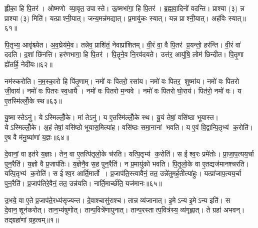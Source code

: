 ह्लीका॒ हि पि॒तर॑।
ओष्मणो व्या॒वृत॒ उपास्ते।
ऊ॒ष्मभा॑गा॒ हि पि॒तर॑।
ब्र॒ह्म॒वा॒दिनो॑ वदन्ति।
प्राश्या (३) न्न प्राश्या (३) मिति॑।
यत्प्राश्नी॒यात्।
जन्य॒मन्न॑मद्यात्।
प्र॒मायु॑कः स्यात्।
यन्न प्राश्नी॒यात्।
अह॑विः स्यात्॥६१॥

पि॒तृभ्य॒ आवृ॑श्च्येत।
अ॒व॒घ्रेय॑मे॒व।
तन्नेव॒ प्राशि॑तं॒ नेवाप्रा॑शितम्।
वी॒रं वा॒ वै पि॒तर॑ प्र॒यन्तो॒ हर॑न्ति।
वी॒रं वा॑ ददति।
द॒शां छि॑नत्ति।
हर॑णभागा॒ हि पि॒तर॑।
पि॒तॄने॒व नि॒रव॑दयते।
उत्त॑र॒ आयु॑षि॒ लोम॑ छिन्दीत।
पि॒तृ॒णा ह्ये॑तर्\mbox{}हि॒ नेदी॑यः॥६२॥

नम॑स्करोति।
न॒म॒स्का॒रो हि पि॑तृ॒णाम्।
नमो॑ वः पितरो॒ रसा॑य।
नमो॑ वः पितर॒ शुष्मा॑य।
नमो॑ वः पितरो जी॒वाय॑।
नमो॑ वः पितरः स्व॒धायै।
नमो॑ वः पितरो म॒न्यवे।
नमो॑ वः पितरो घो॒राय॑।
पित॑रो॒ नमो॑ वः।
य ए॒तस्मि॑ल्लोँ॒के स्थ॥६३॥

यु॒ष्मास्तेऽनु॑।
येऽस्मिल्लोँ॒के।
मां तेऽनु॑।
य ए॒तस्मि॑ल्लोँ॒के स्थ।
यू॒यं तेषां॒ वसि॑ष्ठा भूयास्त।
येऽस्मिल्लोँ॒के।
अ॒हं तेषां॒ वसि॑ष्ठो भूयास॒मित्या॑ह।
वसि॑ष्ठः समा॒नानां भवति।
य ए॒वं वि॒द्वान्पि॒तृभ्य॑ क॒रोति॑।
ए॒ष वै म॑नु॒ष्या॑णां य॒ज्ञः॥६४॥

दे॒वानां॒ वा इत॑रे य॒ज्ञाः।
तेन॒ वा ए॒तत्पि॑तृलो॒के च॑रति।
यत्पि॒तृभ्य॑ क॒रोति॑।
स ईश्व॒रः प्रमे॑तोः।
प्रा॒जा॒प॒त्यय॒र्चा पुन॒रैति॑।
य॒ज्ञो वै प्र॒जाप॑तिः।
य॒ज्ञेनै॒व स॒ह पुन॒रैति॑।
न प्र॒मायु॑को भवति।
पि॒तृ॒लो॒के वा ए॒तद्यज॑मानश्चरति।
यत्पि॒तृभ्य॑ क॒रोति॑।
स ईश्व॒र आर्ति॒मार्तो।
प्र॒जाप॑ति॒स्त्वावैनं॒ तत॒ उन्ने॑तुमर्\mbox{}ह॒तीत्या॑हुः।
यत्प्रा॑जाप॒त्यय॒र्चा पुन॒रैति॑।
प्र॒जाप॑तिरे॒वैनं॒ तत॒ उन्न॑यति।
नार्ति॒मार्च्छ॑ति॒ यज॑मानः॥६५॥\anuvakamend[इत्य॑श्नुते पद्यन्ते पद्यन्ते॒ षड्वा ऋ॒तवो॑ वर्त॒तेऽह॑विः स्या॒न्नेदी॑य॒ स्थ य॒ज्ञो यज॑मानश्चरति॒ यत्पि॒तृभ्य॑ क॒रोति॒ पञ्च॑ च]




\clearpage
{}
\setcounter{anuvakam}{0}

उ॒भये॒ वा ए॒ते प्र॒जाप॑ते॒रध्य॑सृज्यन्त।
दे॒वाश्चासु॑राश्च।
तान्न व्य॑जानात्।
इ॒मेऽन्य इ॒मेऽन्य इति॑।
स दे॒वान॒शून॑करोत्।
तान॒भ्य॑षुणोत्।
तान्प॒वित्रे॑णापुनात्।
तान्प॒रस्तात्प॒वित्र॑स्य॒ व्य॑गृह्णात्।
ते ग्रहा॑ अभवन्।
तद्ग्रहा॑णां ग्रह॒त्वम्॥१॥

